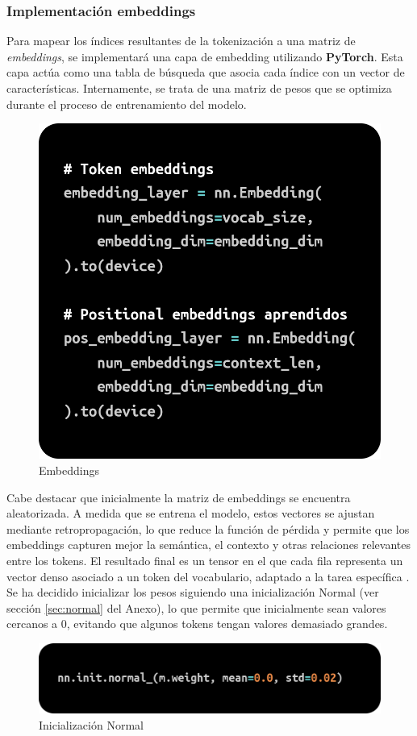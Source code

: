 \documentclass[11pt]{book}
\theoremstyle{plain}
\theoremstyle{definition}
\begin{document}
\subsubsection{Implementación embeddings}
Para mapear los índices resultantes de la tokenización a una matriz de \textit{embeddings}, se implementará una capa de embedding utilizando \textbf{PyTorch}. Esta capa actúa como una tabla de búsqueda que asocia cada índice con un vector de características. Internamente, se trata de una matriz de pesos que se optimiza durante el proceso de entrenamiento del modelo.

\begin{figure}[h]
    \centering
    \includegraphics[width=0.5\linewidth]{img/embeddings1.png}
    \caption{Embeddings}
    \label{fig:placeholder17}
\end{figure}

Cabe destacar que inicialmente la matriz de embeddings se encuentra aleatorizada. A medida que se entrena el modelo, estos vectores se ajustan mediante retropropagación, lo que reduce la función de pérdida y permite que los embeddings capturen mejor la semántica, el contexto y otras relaciones relevantes entre los tokens. El resultado final es un tensor en el que cada fila representa un vector denso asociado a un token del vocabulario, adaptado a la tarea específica \parencite{bao2022embedding}. Se ha decidido inicializar los pesos siguiendo una inicialización Normal (ver sección \ref{sec:normal} del Anexo), lo que permite que inicialmente sean valores cercanos a 0, evitando que algunos tokens tengan valores demasiado grandes. 

\begin{figure}[h]
    \centering
    \includegraphics[width=0.5\linewidth]{img/normal_init.png}
    \caption{Inicialización Normal}
    \label{fig:placeholder18}
\end{figure}
\end{document}
